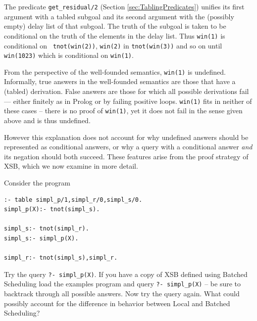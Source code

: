 The predicate {\tt get\_residual/2} (Section \ref{sec:TablingPredicates})
unifies its first argument with a tabled subgoal and its second
argument with the (possibly empty) delay list of that subgoal.  The
truth of the subgoal is taken to be conditional on the truth of the
elements in the delay list.  Thus {\tt win(1)} is conditional on {\tt
tnot(win(2))}, {\tt win(2)} in {\tt tnot(win(3))} and so on until {\tt
win(1023)} which is conditional on {\tt win(1)}.

From the perspective of the well-founded semantics, {\tt win(1)} is
undefined.  Informally, true answers in the well-founded semantics are
those that have a (tabled) derivation.  False answers are those for
which all possible derivations fail --- either finitely as in Prolog
or by failing positive loops.  {\tt win(1)} fits in neither of these
cases -- there is no proof of {\tt win(1)}, yet it does not fail in
the sense given above and is thus undefined.

However this explanation does not account for why undefined answers
should be represented as conditional answers, or why a query with a
conditional answer {\em and} its negation should both succeed.  These
features arise from the proof strategy of XSB, which we now examine in
more detail.

\begin{exercise} \label{ex:simpl}
Consider the program
\begin{verbatim}
:- table simpl_p/1,simpl_r/0,simpl_s/0.
simpl_p(X):- tnot(simpl_s).

simpl_s:- tnot(simpl_r).
simpl_s:- simpl_p(X).

simpl_r:- tnot(simpl_s),simpl_r.
\end{verbatim}
Try the query {\tt ?- simpl\_p(X)}.  If you have a copy of XSB defined
using Batched Scheduling load the examples program and query {\tt ?-
  simpl\_p(X)} -- be sure to backtrack through all possible answers.
Now try the query again.  What could possibly account for the
difference in behavior between Local and Batched Scheduling?
\end{exercise}

